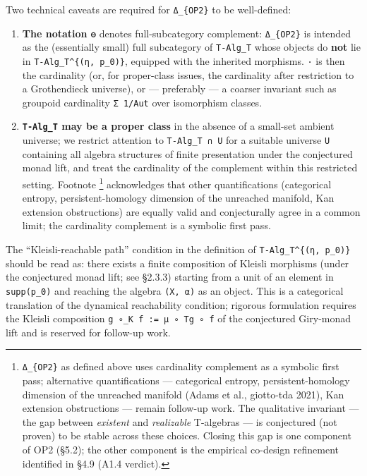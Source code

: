 \documentclass[
]{article}
\begin{document}
Two technical caveats are required for \texttt{Δ\_\{OP2\}} to be
well-defined:

\begin{enumerate}
\def\labelenumi{(\roman{enumi})}
\item
  \textbf{The notation \texttt{⊖}} denotes full-subcategory complement:
  \texttt{Δ\_\{OP2\}} is intended as the (essentially small) full
  subcategory of \texttt{T-Alg\_T} whose objects do \textbf{not} lie in
  \texttt{T-Alg\_T\^{}\{(η,\ p\_0)\}}, equipped with the inherited
  morphisms. \texttt{\textbar{}·\textbar{}} is then the cardinality (or,
  for proper-class issues, the cardinality after restriction to a
  Grothendieck universe), or --- preferably --- a coarser invariant such
  as groupoid cardinality \texttt{Σ\ 1/\textbar{}Aut\textbar{}} over
  isomorphism classes.
\item
  \textbf{\texttt{T-Alg\_T} may be a proper class} in the absence of a
  small-set ambient universe; we restrict attention to
  \texttt{T-Alg\_T\ ∩\ U} for a suitable universe \texttt{U} containing
  all algebra structures of finite presentation under the conjectured
  monad lift, and treat the cardinality of the complement within this
  restricted setting. Footnote \footnote{\texttt{Δ\_\{OP2\}} as defined
    above uses cardinality complement as a symbolic first pass;
    alternative quantifications --- categorical entropy,
    persistent-homology dimension of the unreached manifold (Adams et
    al., giotto-tda 2021), Kan extension obstructions --- remain
    follow-up work. The qualitative invariant --- the gap between
    \emph{existent} and \emph{realizable} T-algebras --- is conjectured
    (not proven) to be stable across these choices. Closing this gap is
    one component of OP2 (§5.2); the other component is the empirical
    co-design refinement identified in §4.9 (A1.4 verdict).}
  acknowledges that other quantifications (categorical entropy,
  persistent-homology dimension of the unreached manifold, Kan extension
  obstructions) are equally valid and conjecturally agree in a common
  limit; the cardinality complement is a symbolic first pass.
\end{enumerate}

The ``Kleisli-reachable path'' condition in the definition of
\texttt{T-Alg\_T\^{}\{(η,\ p\_0)\}} should be read as: there exists a
finite composition of Kleisli morphisms (under the conjectured monad
lift; see §2.3.3) starting from a unit of an element in
\texttt{supp(p\_0)} and reaching the algebra \texttt{(X,\ α)} as an
object. This is a categorical translation of the dynamical reachability
condition; rigorous formulation requires the Kleisli composition
\texttt{g\ ∘\_K\ f\ :=\ μ\ ∘\ Tg\ ∘\ f} of the conjectured Giry-monad
lift and is reserved for follow-up work.
\end{document}
